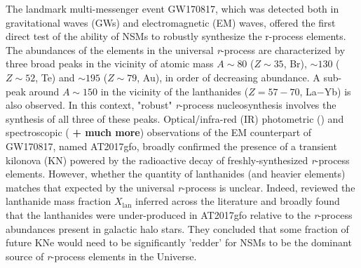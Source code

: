 \documentclass[twocolumn]{aastex63}
\begin{document}
The landmark multi-messenger event GW170817, which was detected both in gravitational waves (GWs) and electromagnetic (EM) waves, offered the first direct test of the ability of NSMs to robustly synthesize the r-process elements. The abundances of the elements in the universal \textit{r}-process are characterized by three broad peaks in the vicinity of atomic mass $A\sim80$ ($Z\sim35$, Br), $\sim130$ ($Z\sim52$, Te) and $\sim195$ ($Z\sim79$, Au), in order of decreasing abundance. A sub-peak around $A\sim150$ in the vicinity of the lanthanides ($Z=57-70$, La$-$Yb) is also observed. In this context, "robust" \textit{r}-process nucleosynthesis involves the synthesis of all three of these peaks. Optical/infra-red (IR) photometric (\citealt{andreoni17, arcavi17, coulter17, diaz17, drout17, evans17, hu17, kasliwal17, lipunov17, shappee17, tanvir17, troja17, utsumi17, valenti17}) and spectroscopic (\citealt{kasen17, pian17, smartt17, cote18} \textbf{+ much more}) observations of the EM counterpart of GW170817, named AT2017gfo, broadly confirmed the presence of a transient kilonova (KN) powered by the radioactive decay of freshly-synthesized \textit{r}-process elements. However, whether the quantity of lanthanides (and heavier elements) matches that expected by the universal \textit{r}-process is unclear. Indeed, \cite{ji19} reviewed the lanthanide mass fraction $X_{\mathrm{lan}}$ inferred across the literature and broadly found that the lanthanides were under-produced in AT2017gfo relative to the \textit{r}-process abundances present in galactic halo stars. They concluded that some fraction of future KNe would need to be significantly 'redder' for NSMs to be the dominant source of \textit{r}-process elements in the Universe. 
\end{document}

